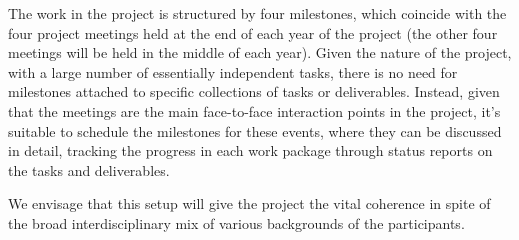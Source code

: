 
The work in the \TheProject project is structured by four milestones,
which coincide with the four project meetings held at the end of each
year of the project (the other four meetings will be held in the middle
of each year). Given the nature of the project, with a
large number of essentially independent tasks, there is no need for
milestones attached to specific collections of tasks or
deliverables. Instead, given that the meetings are the main
face-to-face interaction points in the project, it's suitable to
schedule the milestones for these events, where they can be discussed
in detail, tracking the progress in each work package through status
reports on the tasks and deliverables.

We envisage that this setup will give the project the vital coherence
in spite of the broad interdisciplinary mix of various backgrounds of the
participants.

\newcommand{\WPall}{\WPref{management}, \WPref{dissem}, \WPref{component-architecture}, \WPref{UI}, \WPref{hpc}, \WPref{dksbases}, \WPref{social-aspects}}

\newcommand{\WPnoUI}{\WPref{management}, \WPref{dissem}, \WPref{component-architecture}, \WPref{hpc}, \WPref{dksbases}, \WPref{social-aspects}}

